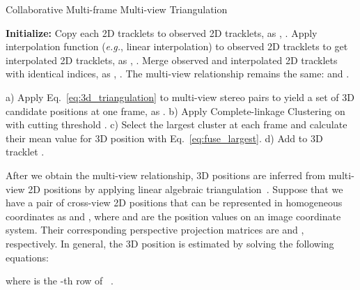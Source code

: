 \documentclass{CVM}
\newcommand{\eg}{{\it e.g.}}
\begin{document}
\begin{algorithm*}[h!]
  \caption{Collaborative Multi-frame Multi-view Triangulation}
  \label{alg:CMMT}
  \begin{algorithmic}[1]
    \begin{small}
  \State \textbf{Initialize:} Copy each 2D tracklets to observed 2D tracklets, as ,   . 
  \State Apply interpolation function  (\eg, linear interpolation) to observed 2D tracklets to get interpolated 2D tracklets, as ,   . \Comment{\textcolor{mygray}{Multi-frame information is implicitly involved through interpolation}} 
  \State Merge observed and interpolated 2D tracklets with identical indices, as ,  . The multi-view relationship remains the same:  and .  

    \State a) Apply Eq.~\eqref{eq:3d_triangulation} to multi-view stereo pairs to yield a set of 3D candidate positions at one frame, as .
    \State b) Apply Complete-linkage Clustering on  with cutting threshold .
    \State c) Select the largest cluster at each frame and calculate their mean value for 3D position  with Eq.~\eqref{eq:fuse_largest}.
    \State d) Add  to 3D tracklet .
  \EndFor
  \EndFor
\end{small}
\end{algorithmic}
\end{algorithm*}




After we obtain the multi-view relationship, 3D positions are inferred from multi-view 2D positions by applying linear algebraic triangulation~\cite{andrew2001multiple}. Suppose that we have a pair of cross-view 2D positions that can be represented in homogeneous coordinates as  and , where  and  are the position values on an image coordinate system. Their corresponding perspective projection matrices are  and , respectively. In general, the 3D position  is estimated by solving the following equations:

where  is the -th row of ~\cite{andrew2001multiple}. 
\end{document}

